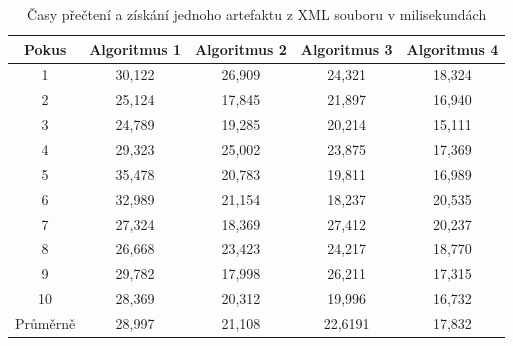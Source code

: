 \documentclass[czech,master]{diploma}
\begin{document}
\begin{table}[htp]
\centering
\begin{tabular}{@{}ccccc@{}}
\toprule
\textbf{Pokus} & \textbf{Algoritmus 1} & \textbf{Algoritmus 2} & \textbf{Algoritmus 3} & \textbf{Algoritmus 4} \\ \midrule
1                 & 30,122                & 26,909                & 24,321                & 18,324                \\
2                 & 25,124                & 17,845                & 21,897                & 16,940                \\
3                 & 24,789                & 19,285                & 20,214                & 15,111                \\
4                 & 29,323                & 25,002                & 23,875                & 17,369                \\
5                 & 35,478                & 20,783                & 19,811                & 16,989                \\
6                 & 32,989                & 21,154                & 18,237                & 20,535                \\
7                 & 27,324                & 18,369                & 27,412                & 20,237                \\
8                 & 26,668                & 23,423                & 24,217                & 18,770                \\
9                 & 29,782                & 17,998                & 26,211                & 17,315                \\
10                & 28,369                & 20,312                & 19,996                & 16,732                \\ \midrule
Průměrně          & 28,997               & 21,108                & 22,6191               & 17,832                \\ \bottomrule
\end{tabular}
\caption{Časy přečtení a získání jednoho artefaktu z XML souboru v milisekundách}
\label{tab:xml_read}
\end{table}
\end{document}
